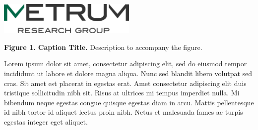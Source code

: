 \documentclass[portrait,fontscale=0.46,paperwidth=36in,paperheight=48in]{baposter}
\newcommand{\colorBF}[1]{\textcolor{colorText}{\textbf{#1}}}
\begin{document}
\begin{poster}
{%
	\begin{minipage}[c]{0.33\linewidth}
		\begin{demobx}[]
			\begin{center}
				\includegraphics[width=18em]{newlogo} 
			\end{center}
			\small{\colorBF{Figure 1. Caption Title.} Description to accompany the figure.}
		\end{demobx}
	\end{minipage} %
	\begin{minipage}[c]{0.66\linewidth}
		\begin{demobx}[]
			Lorem ipsum dolor sit amet, consectetur adipiscing elit, sed do eiusmod tempor incididunt ut labore et dolore magna aliqua. Nunc sed blandit libero volutpat sed cras. Sit amet est placerat in egestas erat. Amet consectetur adipiscing elit duis tristique sollicitudin nibh sit. Risus at ultrices mi tempus imperdiet nulla. Mi bibendum neque egestas congue quisque egestas diam in arcu. Mattis pellentesque id nibh tortor id aliquet lectus proin nibh. Netus et malesuada fames ac turpis egestas integer eget aliquet.
		\end{demobx}
	\end{minipage} %
}






\end{poster}
\end{document}

